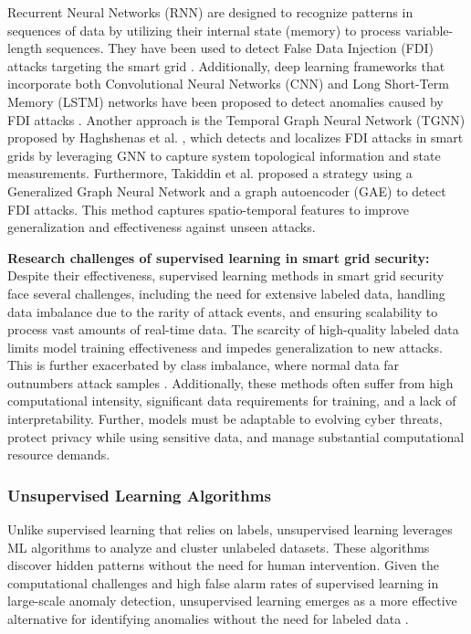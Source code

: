 \documentclass[10pt, journal]{IEEEtran}
\begin{document}
Recurrent Neural Networks (RNN) are designed to recognize patterns in sequences of data by utilizing their internal state (memory) to process variable-length sequences. They have been used to detect False Data Injection (FDI) attacks targeting the smart grid \cite{ayad2018detection}. Additionally, deep learning frameworks that incorporate both Convolutional Neural Networks (CNN) and Long Short-Term Memory (LSTM) networks have been proposed to detect anomalies caused by FDI attacks \cite{niu2019dynamic}. Another approach is the Temporal Graph Neural Network (TGNN) proposed by Haghshenas et al. \cite{haghshenas2023temporal}, which detects and localizes FDI attacks in smart grids by leveraging GNN to capture system topological information and state measurements. Furthermore, Takiddin et al. \cite{takiddin2023generalized} proposed a strategy using a Generalized Graph Neural Network and a graph autoencoder (GAE) to detect FDI attacks. This method captures spatio-temporal features to improve generalization and effectiveness against unseen attacks.
    
{\bf Research challenges of supervised learning in smart grid security:}
Despite their effectiveness, supervised learning methods in smart grid security face several challenges, including the need for extensive labeled data, handling data imbalance due to the rarity of attack events, and ensuring scalability to process vast amounts of real-time data. The scarcity of high-quality labeled data limits model training effectiveness and impedes generalization to new attacks. This is further exacerbated by class imbalance, where normal data far outnumbers attack samples \cite{musleh2019survey}. Additionally, these methods often suffer from high computational intensity, significant data requirements for training, and a lack of interpretability. Further, models must be adaptable to evolving cyber threats, protect privacy while using sensitive data, and manage substantial computational resource demands. 


        
\subsubsection{Unsupervised Learning Algorithms}

Unlike supervised learning that relies on labels, unsupervised learning leverages ML algorithms to analyze and cluster unlabeled datasets. These algorithms discover hidden patterns without the need for human intervention. Given the computational challenges and high false alarm rates of supervised learning in large-scale anomaly detection, unsupervised learning emerges as a more effective alternative for identifying anomalies without the need for labeled data \cite{chandola2009anomaly}.
\end{document}
